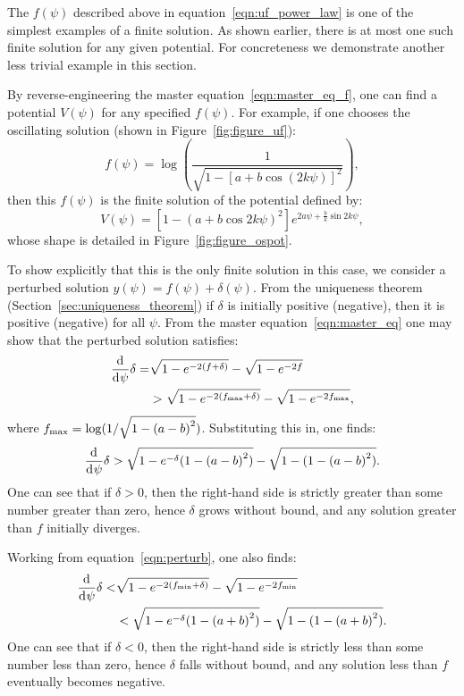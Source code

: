 The \(f(\psi)\) described above in equation~\eqref{eqn:uf_power_law} is one of the simplest examples of a finite solution. As shown earlier, there is at most one such finite solution for any given potential. For concreteness we demonstrate another less trivial example in this section.

By reverse-engineering the master equation~\eqref{eqn:master_eq_f}, one can find a potential \(V(\psi)\) for any specified \(f(\psi)\). For example, if one chooses the oscillating solution (shown in Figure~\ref{fig:figure_uf}):
\begin{equation}
  f(\psi) = \log\left( \frac{1}{\sqrt{1-{[a+b\cos(2k\psi)]}^2}}\right),
  \label{eqn:uf_example}
\end{equation}
then this \(f(\psi)\) is the finite solution of the potential defined by:
\begin{equation}
	V(\psi)
    =
    \left[ 1-{(a+b \cos2k\psi)}^2 \right]
    e^{2 a \psi +\frac{b}{k} \sin 2k\psi},
    \label{eqn:Vphi_uf_example}
\end{equation}
whose shape is detailed in Figure~\ref{fig:figure_ospot}.

To show explicitly that this is the only finite solution in this case, we consider a perturbed solution \(y(\psi) = f(\psi)+\delta(\psi)\).  From the uniqueness theorem (Section~\ref{sec:uniqueness_theorem}) if \(\delta\) is initially positive (negative), then it is positive (negative) for all \(\psi\). From the master equation~\eqref{eqn:master_eq} one may show that the perturbed solution satisfies:
\begin{align}
  \frac{\operatorname{d}^{}\!{}}{\operatorname{d}^{}\!{\psi}}\delta 
  =& 
  \sqrt{1-e^{-2(f+\delta)}} -\sqrt{1-e^{-2f}} 
  \nonumber
  \\
  &>
  \sqrt{1-e^{-2(f_\mathrm{max}+\delta)}} -\sqrt{1-e^{-2f_\mathrm{max}}},
  \label{eqn:perturb}
\end{align}
where \(f_\mathrm{max} = \log(1/\sqrt{1-{(a-b)}^2})\). Substituting this in, one finds:
\begin{align}
  \frac{\operatorname{d}^{}\!{}}{\operatorname{d}^{}\!{\psi}}\delta 
  > 
  \sqrt{1-e^{-\delta}({1-{(a-b)}^2})} - \sqrt{1-({1-{(a-b)}^2})}.
\end{align}
One can see that if \(\delta>0\), then the right-hand side is strictly greater than some number greater than zero, hence \(\delta\) grows without bound, and any solution greater than \(f\) initially diverges. 

Working from equation~\eqref{eqn:perturb}, one also finds:
\begin{align}
  \frac{\operatorname{d}^{}\!{}}{\operatorname{d}^{}\!{\psi}}\delta 
  <&
  \sqrt{1-e^{-2(f_\mathrm{min}+\delta)}} -\sqrt{1-e^{-2f_\mathrm{min}}} 
  \nonumber
  \\
  &<
  \sqrt{1-e^{-\delta}({1-{(a+b)}^2})} - \sqrt{1-({1-{(a+b)}^2})}.
\end{align}
One can see that if \(\delta<0\), then the right-hand side is strictly less than some number less than zero, hence \(\delta\) falls without bound, and any solution less than \(f\) eventually becomes negative. 


